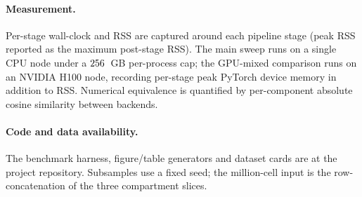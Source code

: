 \documentclass[11pt]{article}
\begin{document}
\paragraph{Measurement.} Per-stage wall-clock and RSS are captured around
each pipeline stage (peak RSS reported as the maximum post-stage RSS).
The main sweep runs on a single CPU node under a $256$~GB per-process
cap; the GPU-mixed comparison runs on an NVIDIA H100 node, recording per-stage
peak PyTorch device memory in addition to RSS. Numerical equivalence is
quantified by per-component absolute cosine similarity between backends.

\paragraph{Code and data availability.} The benchmark harness, figure/table
generators and dataset cards are at the project
repository\cite{anndataoom}. Subsamples use a fixed seed; the
million-cell input is the row-concatenation of the three compartment slices.



\end{document}
